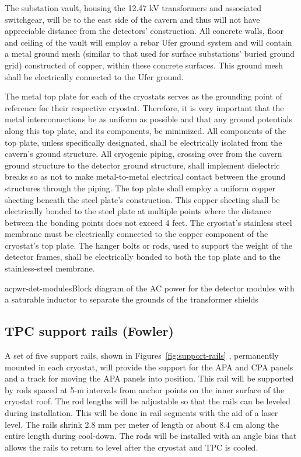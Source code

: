 The substation vault, housing the 12.47 kV transformers and associated switchgear, will be to the east side of the cavern and thus will not have appreciable distance from the detectors' construction. All 
concrete walls, floor and ceiling of the vault will employ a rebar Ufer ground system and will contain a metal ground mesh (similar to that used for surface substations' buried ground grid) constructed of 
copper, within these concrete surfaces. This ground mesh shall be electrically connected to the Ufer ground.

The metal top plate for each of the cryostats serves as the grounding point of reference for their respective cryostat. Therefore, it is very important that the metal interconnections be as uniform as 
possible and that any ground potentials along this top plate, and its components, be minimized. All components of the top plate, unless specifically designated, shall be electrically isolated from the cavern's ground structure. All cryogenic piping, crossing over from the cavern ground structure to the 
detector ground structure, shall implement dielectric breaks so as not to make metal-to-metal electrical contact between the ground structures through the piping. The top plate shall employ a uniform copper 
sheeting beneath the steel plate's construction. This copper sheeting shall be electrically bonded to the steel plate at multiple points where the distance between the bonding points does not exceed 4 feet. The cryostat's stainless steel membrane must be electrically connected to the copper component of the 
cryostat's top plate. The hanger bolts or rods, used to support the weight of the detector frames, shall be 
electrically bonded to both the top plate and to the stainless-steel membrane.

\begin{cdrfigure}{acpwr-det-modules}{Block diagram of the AC power for the detector modules with a saturable inductor to separate the grounds of the transformer shields}
\end{cdrfigure}

\subsection{TPC support rails (Fowler)}
\label{fd:install:integ:rails}

A set of five support rails, shown in Figures~\ref{fig:support-rails} , permanently mounted in each cryostat, will provide the support for the APA and CPA panels and a track for moving the APA panels into position.  
This rail will be supported by rods spaced at 5-m intervals from anchor points on the inner surface of the cryostat roof.  The rod lengths will be adjustable so that the rails can be leveled during installation.  This will be done in rail segments with the aid of a laser level.  The rails shrink 
2.8 mm per meter of length or about 8.4 cm along the entire length during cool-down.  The rods will be installed with an angle bias that allows the rails to return to level after the cryostat and TPC is cooled.

